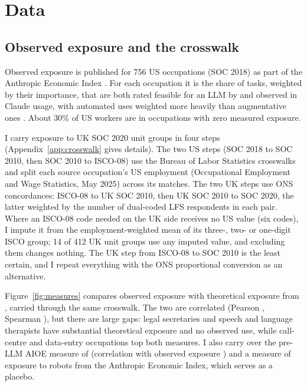 \documentclass[11pt]{article}
\begin{document}
\section{Data}\label{sec:data}

\subsection{Observed exposure and the crosswalk}

Observed exposure is published for 756 US occupations (SOC 2018) as part of the Anthropic Economic Index \citep{aei2026}. For each occupation it is the share of tasks, weighted by their importance, that are both rated feasible for an LLM by \citet{eloundou2024} and observed in Claude usage, with automated uses weighted more heavily than augmentative ones \citep{massenkoff2026}. About 30\% of US workers are in occupations with zero measured exposure.

I carry exposure to UK SOC 2020 unit groups in four steps (Appendix~\ref{app:crosswalk} gives details). The two US steps (SOC 2018 to SOC 2010, then SOC 2010 to ISCO-08) use the Bureau of Labor Statistics crosswalks and split each source occupation's US employment (Occupational Employment and Wage Statistics, May 2025) across its matches. The two UK steps use ONS concordances: ISCO-08 to UK SOC 2010, then UK SOC 2010 to SOC 2020, the latter weighted by the number of dual-coded LFS respondents in each pair. Where an ISCO-08 code needed on the UK side receives no US value (six codes), I impute it from the employment-weighted mean of its three-, two- or one-digit ISCO group; 14 of 412 UK unit groups use any imputed value, and excluding them changes nothing. The UK step from ISCO-08 to SOC 2010 is the least certain, and I repeat everything with the ONS proportional conversion as an alternative.

Figure~\ref{fig:measures} compares observed exposure with theoretical exposure from \citet{eloundou2024}, carried through the same crosswalk. The two are correlated (Pearson \corGPT, Spearman \corGPTrank), but there are large gaps: legal secretaries and speech and language therapists have substantial theoretical exposure and no observed use, while call-centre and data-entry occupations top both measures. I also carry over the pre-LLM AIOE measure of \citet{felten2021} (correlation with observed exposure \corAIOE) and a measure of exposure to robots from the Anthropic Economic Index, which serves as a placebo.
\end{document}
